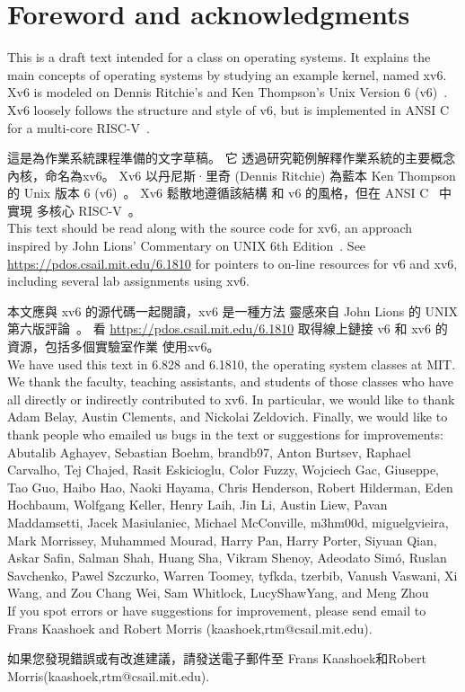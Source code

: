 \chapter*{Foreword and acknowledgments}


This is a draft text intended for a class on operating systems. It
explains the main concepts of operating systems by studying an example
kernel, named xv6.  Xv6 is modeled on Dennis Ritchie's and
Ken Thompson's Unix Version 6 (v6)~\cite{unix}.  Xv6 loosely follows the structure
and style of v6, but is implemented in ANSI C~\cite{kernighan} for 
a multi-core RISC-V~\cite{riscv}.

這是為作業系統課程準備的文字草稿。 它
透過研究範例解釋作業系統的主要概念
內核，命名為xv6。 Xv6 以丹尼斯·里奇 (Dennis Ritchie) 為藍本
Ken Thompson 的 Unix 版本 6 (v6)~\cite{unix}。 Xv6 鬆散地遵循該結構
和 v6 的風格，但在 ANSI C~\cite{kernighan} 中實現
多核心 RISC-V~\cite{riscv}。\\

This text should be read along with the source code for xv6, an approach 
inspired by John Lions' Commentary on UNIX 6th Edition~\cite{lions}. See
\url{https://pdos.csail.mit.edu/6.1810} for pointers to on-line
resources for v6 and xv6, including several lab assignments
using xv6.

本文應與 xv6 的源代碼一起閱讀，xv6 是一種方法
靈感來自 John Lions 的 UNIX 第六版評論~\cite{lions}。 看
\url{https://pdos.csail.mit.edu/6.1810} 取得線上鏈接
v6 和 xv6 的資源，包括多個實驗室作業
使用xv6。\\

We have used this text in 6.828 and 6.1810, the operating system
classes at MIT.  We thank the faculty, teaching assistants, and
students of those classes who have all directly or indirectly
contributed to xv6.  In particular, we would like to thank Adam Belay,
Austin Clements, and Nickolai Zeldovich.  Finally, we would like to
thank people who emailed us bugs in the text or suggestions for
improvements: Abutalib Aghayev, Sebastian Boehm, brandb97, Anton
Burtsev, Raphael Carvalho, Tej Chajed, Rasit Eskicioglu, Color Fuzzy,
Wojciech Gac, Giuseppe, Tao Guo, Haibo Hao, Naoki Hayama, Chris
Henderson, Robert Hilderman, Eden Hochbaum, Wolfgang Keller, Henry
Laih, Jin Li, Austin Liew, Pavan Maddamsetti, Jacek Masiulaniec,
Michael McConville, m3hm00d, miguelgvieira, Mark Morrissey, Muhammed
Mourad, Harry Pan, Harry Porter, Siyuan Qian, Askar Safin, Salman
Shah, Huang Sha, Vikram Shenoy,  Adeodato Simó, Ruslan Savchenko, Pawel Szczurko,
Warren Toomey, tyfkda, tzerbib, Vanush Vaswani, Xi Wang, and Zou Chang
Wei, Sam Whitlock, LucyShawYang, and Meng Zhou\\

If you spot errors or have suggestions for improvement, please send email to
Frans Kaashoek and Robert Morris (kaashoek,rtm@csail.mit.edu).

如果您發現錯誤或有改進建議，請發送電子郵件至
Frans Kaashoek和Robert Morris(kaashoek,rtm@csail.mit.edu).